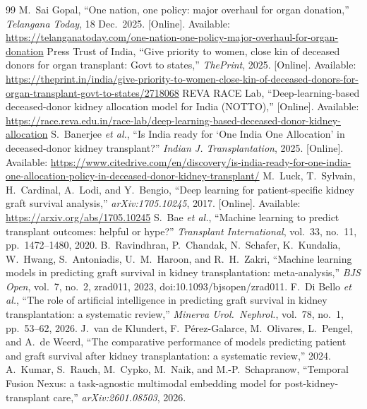 \documentclass[journal]{IEEEtran}
\begin{document}
\begin{thebibliography}{99}
\setlength{\itemsep}{0pt plus 0.2pt}
 M.\ Sai Gopal, ``One nation, one policy: major overhaul for organ donation,'' \textit{Telangana Today}, 18 Dec.\ 2025. [Online]. Available: \url{https://telanganatoday.com/one-nation-one-policy-major-overhaul-for-organ-donation}
 Press Trust of India, ``Give priority to women, close kin of deceased donors for organ transplant: Govt to states,'' \textit{ThePrint}, 2025. [Online]. Available: \url{https://theprint.in/india/give-priority-to-women-close-kin-of-deceased-donors-for-organ-transplant-govt-to-states/2718068}
 REVA RACE Lab, ``Deep-learning-based deceased-donor kidney allocation model for India (NOTTO),'' [Online]. Available: \url{https://race.reva.edu.in/race-lab/deep-learning-based-deceased-donor-kidney-allocation}
 S.\ Banerjee \textit{et al.}, ``Is India ready for `One India One Allocation' in deceased-donor kidney transplant?'' \textit{Indian J. Transplantation}, 2025. [Online]. Available: \url{https://www.citedrive.com/en/discovery/is-india-ready-for-one-india-one-allocation-policy-in-deceased-donor-kidney-transplant/}
 M.\ Luck, T.\ Sylvain, H.\ Cardinal, A.\ Lodi, and Y.\ Bengio, ``Deep learning for patient-specific kidney graft survival analysis,'' \textit{arXiv:1705.10245}, 2017. [Online]. Available: \url{https://arxiv.org/abs/1705.10245}
 S.\ Bae \textit{et al.}, ``Machine learning to predict transplant outcomes: helpful or hype?'' \textit{Transplant International}, vol.\ 33, no.\ 11, pp.\ 1472--1480, 2020.
 B.\ Ravindhran, P.\ Chandak, N.\ Schafer, K.\ Kundalia, W.\ Hwang, S.\ Antoniadis, U.\ M.\ Haroon, and R.\ H.\ Zakri, ``Machine learning models in predicting graft survival in kidney transplantation: meta-analysis,'' \textit{BJS Open}, vol.\ 7, no.\ 2, zrad011, 2023, doi:10.1093/bjsopen/zrad011.
 F.\ Di Bello \textit{et al.}, ``The role of artificial intelligence in predicting graft survival in kidney transplantation: a systematic review,'' \textit{Minerva Urol.\ Nephrol.}, vol.\ 78, no.\ 1, pp.\ 53--62, 2026.
 J.\ van de Klundert, F.\ P\'erez-Galarce, M.\ Olivares, L.\ Pengel, and A.\ de Weerd, ``The comparative performance of models predicting patient and graft survival after kidney transplantation: a systematic review,'' 2024.
 A.\ Kumar, S.\ Rauch, M.\ Cypko, M.\ Naik, and M.-P.\ Schapranow, ``Temporal Fusion Nexus: a task-agnostic multimodal embedding model for post-kidney-transplant care,'' \textit{arXiv:2601.08503}, 2026.

\end{thebibliography}
\end{document}
